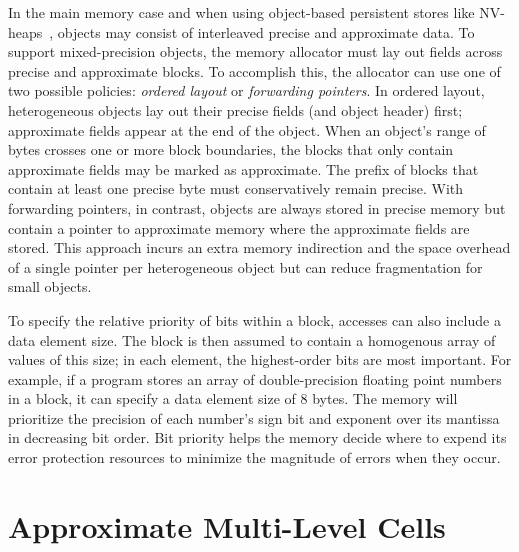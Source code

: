 In the main memory case and when using object-based persistent stores like
NV-heaps~\cite{nvheaps}, objects may consist of interleaved precise and
approximate data. To support mixed-precision objects, the memory allocator
must lay out fields across precise and approximate blocks.
To accomplish this, the allocator can use one of two possible policies:
\emph{ordered layout} or \emph{forwarding pointers}. In ordered
layout, heterogeneous objects lay out their
precise fields (and object header) first; approximate fields appear at the end
of the object. When an object's range of bytes crosses one or more block
boundaries, the blocks that only contain approximate fields may be marked as
approximate. The prefix of blocks that contain at least one precise byte must
conservatively remain precise. With forwarding pointers, in contrast, objects
are always stored in precise memory but contain a pointer to approximate memory
where the approximate fields are stored. This approach incurs an extra memory
indirection and the space overhead of a single pointer per heterogeneous object but can
reduce fragmentation for small objects.

To specify the relative
priority of bits within a block, accesses can also include a data
element size. The block is then assumed to contain a homogenous
array of values of this size; in each element, the highest-order bits
are most important. For example, if a program
stores an array of double-precision floating point numbers in a block,
it can specify a data element size of 8 bytes. The memory will
prioritize the precision of each number's sign bit and exponent over
its mantissa in decreasing bit order. Bit priority
helps the memory decide where to expend its error protection
resources to minimize the magnitude of errors when they occur.

\section{Approximate Multi-Level Cells}
\label{approxstorage:sec:amlc}

